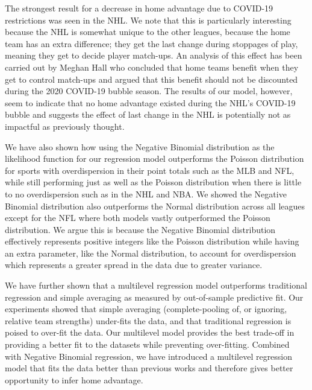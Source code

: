 The strongest result for a decrease in home advantage due to COVID-19 restrictions was seen in the NHL. We note that this is particularly interesting because the NHL is somewhat unique to the other leagues, because the home team has an extra difference; they get the last change during stoppages of play, meaning they get to decide player match-ups. An analysis of this effect has been carried out by Meghan Hall \cite{Hall2020} who concluded that home teams benefit when they get to control match-ups and argued that this benefit should not be discounted during the 2020 COVID-19 bubble season. The results of our model, however, seem to indicate that no home advantage existed during the NHL's COVID-19 bubble and suggests the effect of last change in the NHL is potentially not as impactful as previously thought.

We have also shown how using the Negative Binomial distribution as the likelihood function for our regression model outperforms the Poisson distribution for sports with overdispersion in their point totals such as the MLB and NFL, while still performing just as well as the Poisson distribution when there is little to no overdispersion such as in the NHL and NBA. We showed the Negative Binomial distribution also outperforms the Normal distribution across all leagues except for the NFL where both models vastly outperformed the Poisson distribution. We argue this is because the Negative Binomial distribution effectively represents positive integers like the Poisson distribution while having an extra parameter, like the Normal distribution, to account for overdispersion which represents a greater spread in the data due to greater variance.

We have further shown that a multilevel regression model outperforms traditional regression and simple averaging as measured by out-of-sample predictive fit. Our experiments showed that simple averaging (complete-pooling of, or ignoring, relative team strengths) under-fits the data, and that traditional regression is poised to over-fit the data. Our multilevel model provides the best trade-off in providing a better fit to the datasets while preventing over-fitting. Combined with Negative Binomial regression, we have introduced a multilevel regression model that fits the data better than previous works and therefore gives better opportunity to infer home advantage.

